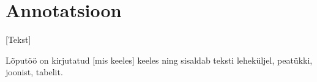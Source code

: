 \section*{\centering Annotatsioon \\
}

[Tekst]

Lõputöö on kirjutatud [mis keeles] keeles ning sisaldab teksti
\pageref*{EndOfMainPart} leheküljel,  peatükki,\linebreak
{} joonist,  tabelit.

\pagebreak
